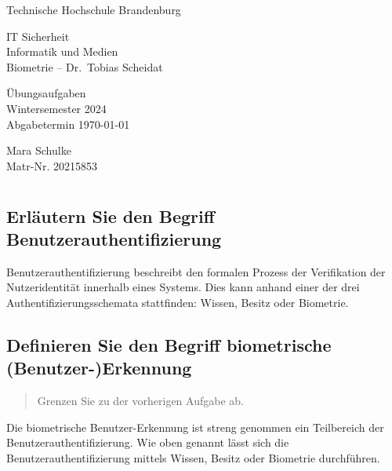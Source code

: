 \documentclass{article}
\newcommand{\annotation}[1]{
    \begin{quote}
    	\begin{textit}
			{#1}
	    \end{textit}
    \end{quote}
}
\begin{document}
\begin{titlepage}
	\begin{center}
		\begin{Large}
			Technische Hochschule Brandenburg \\[1em]
		\end{Large}
		
		IT Sicherheit \\
		Informatik und Medien \\
		Biometrie – Dr.\ Tobias Scheidat
	\end{center}
	
	\vfill

	\begin{center}
		\Large{Übungsaufgaben}\\[0.5em]
		\large{Wintersemester 2024}\\[0.25em]
		\large{Abgabetermin \today}
	\end{center}

	\vfill

	\begin{center}
		Mara Schulke \\ Matr-Nr. 20215853
	\end{center}
\end{titlepage}


\tableofcontents

\listoffigures

\newpage

\section{}

\subsection{Erl\"autern Sie den Begriff Benutzerauthentifizierung}

Benutzerauthentifizierung beschreibt den formalen Prozess der Verifikation der Nutzeridentität innerhalb 
eines Systems. Dies kann anhand einer der drei Authentifizierungsschemata stattfinden: Wissen, Besitz oder 
Biometrie.

\subsection{Definieren Sie den Begriff biometrische (Benutzer-)Erkennung}
\annotation{Grenzen Sie zu der vorherigen Aufgabe ab.}
Die biometrische Benutzer-Erkennung ist streng genommen ein Teilbereich der Benutzerauthentifizierung. Wie 
oben genannt lässt sich die Benutzerauthentifizierung mittels Wissen, Besitz oder Biometrie durchführen.
\end{document}
